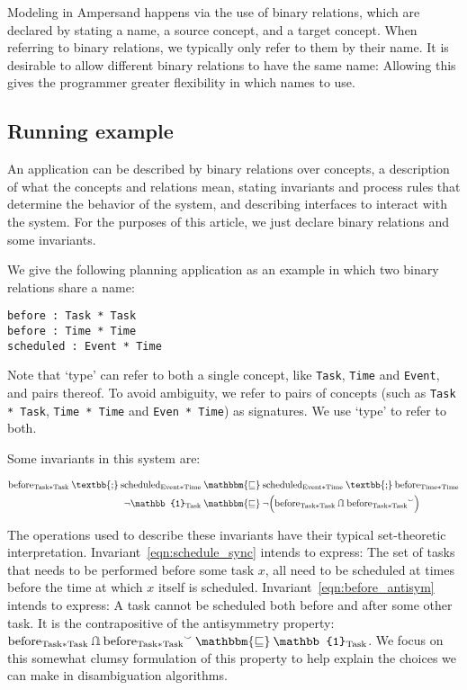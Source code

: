 \documentclass[12pt]{article}
\newcommand{\typesemi}{\mathbin{\text{\textbb{;}}}}
\newcommand{\typesubset}{\mathbin{\mathbbm{\sqsubseteq}}}
\newcommand{\typeunion}{\mathbin{\mathbb{U}}}
\newcommand{\typeinter}{\mathbin{\text{\rotatebox[origin=c]{180}{$\typeunion$}}}}
\newcommand{\typecomp}[1]{\neg{#1}}
\newcommand{\typeconv}[1]{{#1}^\smallsmile}
\newcommand{\typeident}{\mathbb{1}}
\begin{document}
Modeling in Ampersand happens via the use of binary relations, which are declared by stating a name, a source concept, and a target concept.
When referring to binary relations, we typically only refer to them by their name.
It is desirable to allow different binary relations to have the same name:
Allowing this gives the programmer greater flexibility in which names to use.

\subsection*{Running example}
An application can be described by binary relations over concepts, a description of what the concepts and relations mean, stating invariants and process rules that determine the behavior of the system, and describing interfaces to interact with the system.
For the purposes of this article, we just declare binary relations and some invariants.

We give the following planning application as an example in which two binary relations share a name:
\begin{verbatim}
before : Task * Task
before : Time * Time
scheduled : Event * Time
\end{verbatim}

Note that `type' can refer to both a single concept, like \verb=Task=, \verb=Time= and \verb=Event=, and pairs thereof.
To avoid ambiguity, we refer to pairs of concepts (such as \verb=Task * Task=, \verb=Time * Time= and \verb=Even * Time=) as signatures.
We use `type' to refer to both.

Some invariants in this system are:

\begin{align}
\mathrm{before}_{\mathrm{Task * Task}}\typesemi\mathrm{scheduled}_{\mathrm{Event * Time}} &\typesubset \mathrm{scheduled}_\mathrm{Event * Time}\typesemi\mathrm{before}_{\mathrm{Time * Time}} \label{eqn:schedule_sync}
 \\
\typecomp{\typeident_\mathrm{Task}} &\typesubset \typecomp{\left(\mathrm{before}_{\mathrm{Task * Task}} \typeinter \typeconv{{\mathrm{before}_{\mathrm{Task * Task}}}}\right)}
\label{eqn:before_antisym}
\end{align}

The operations used to describe these invariants have their typical set-theoretic interpretation.
Invariant~\ref{eqn:schedule_sync} intends to express: The set of tasks that needs to be performed before some task $x$, all need to be scheduled at times before the time at which $x$ itself is scheduled.
Invariant~\ref{eqn:before_antisym} intends to express: A task cannot be scheduled both before and after some other task.
It is the contrapositive of the antisymmetry property: ${\mathrm{before}_{\mathrm{Task * Task}}} \typeinter {\typeconv{{\mathrm{before}_{\mathrm{Task * Task}}}}} \typesubset \typeident_\mathrm{Task}$.
We focus on this somewhat clumsy formulation of this property to help explain the choices we can make in disambiguation algorithms.
\end{document}
